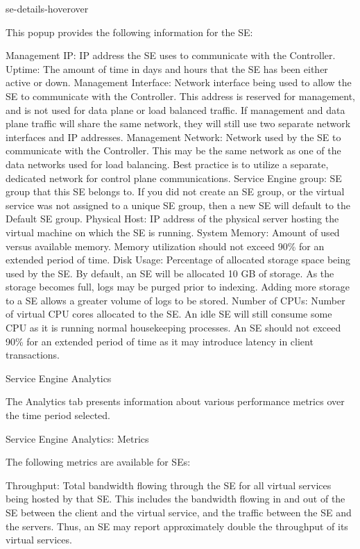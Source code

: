 \documentclass[letterpaper,10pt,english]{sphinxmanual}
\begin{document}
se-details-hoverover

This popup provides the following information for the SE:

Management IP: IP address the SE uses to communicate with the Controller.
Uptime: The amount of time in days and hours that the SE has been either active or down.
Management Interface: Network interface being used to allow the SE to communicate with the Controller. This address is reserved for management, and is not used for data plane or load balanced traffic. If management and data plane traffic will share the same network, they will still use two separate network interfaces and IP addresses.
Management Network: Network used by the SE to communicate with the Controller. This may be the same network as one of the data networks used for load balancing. Best practice is to utilize a separate, dedicated network for control plane communications.
Service Engine group: SE group that this SE belongs to. If you did not create an SE group, or the virtual service was not assigned to a unique SE group, then a new SE will default to the Default SE group.
Physical Host: IP address of the physical server hosting the virtual machine on which the SE is running.
System Memory: Amount of used versus available memory. Memory utilization should not exceed 90\% for an extended period of time.
Disk Usage: Percentage of allocated storage space being used by the SE. By default, an SE will be allocated 10 GB of storage. As the storage becomes full, logs may be purged prior to indexing. Adding more storage to a SE allows a greater volume of logs to be stored.
Number of CPUs: Number of virtual CPU cores allocated to the SE. An idle SE will still consume some CPU as it is running normal housekeeping processes. An SE should not exceed 90\% for an extended period of time as it may introduce latency in client transactions.

Service Engine Analytics

The Analytics tab presents information about various performance metrics over the time period selected.

Service Engine Analytics: Metrics

The following metrics are available for SEs:

Throughput: Total bandwidth flowing through the SE for all virtual services being hosted by that SE. This includes the bandwidth flowing in and out of the SE between the client and the virtual service, and the traffic between the SE and the servers. Thus, an SE may report approximately double the throughput of its virtual services.
\end{document}
